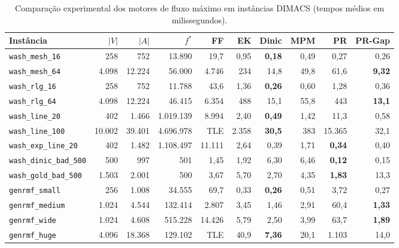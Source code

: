 \begin{table}[!ht]
\centering
\small
\setlength{\tabcolsep}{3.5pt}
\begin{tabular}{lrrrrrrrrr}
\toprule
\textbf{Instância} & $|V|$ & $|A|$ & $f^*$ & \textbf{FF} & \textbf{EK} & \textbf{Dinic} & \textbf{MPM} & \textbf{PR} & \textbf{PR-Gap} \\
\midrule
\texttt{wash\_mesh\_16} & 258 & 752 & 13.890 & 19,7 & 0,95 & \textbf{0,18} & 0,49 & 0,27 & 0,26 \\
\texttt{wash\_mesh\_64} & 4.098 & 12.224 & 56.000 & 4.746 & 234 & 14,8 & 49,8 & 61,6 & \textbf{9,32} \\
\texttt{wash\_rlg\_16} & 258 & 752 & 11.788 & 43,6 & 1,36 & \textbf{0,26} & 0,60 & 1,28 & 0,36 \\
\texttt{wash\_rlg\_64} & 4.098 & 12.224 & 46.415 & 6.354 & 488 & 15,1 & 55,8 & 443 & \textbf{13,1} \\
\texttt{wash\_line\_20} & 402 & 1.466 & 1.019.139 & 8.994 & 2,40 & \textbf{0,49} & 1,42 & 11,3 & 0,58 \\
\texttt{wash\_line\_100} & 10.002 & 39.401 & 4.696.978 & TLE & 2.358 & \textbf{30,5} & 383 & 15.365 & 32,1 \\
\texttt{wash\_exp\_line\_20} & 402 & 1.482 & 1.108.497 & 11.111 & 2,64 & 0,39 & 1,71 & \textbf{0,34} & 0,40 \\
\texttt{wash\_dinic\_bad\_500} & 500 & 997 & 501 & 1,45 & 1,92 & 6,30 & 6,46 & \textbf{0,12} & 0,15 \\
\texttt{wash\_gold\_bad\_500} & 1.503 & 2.001 & 500 & 3,67 & 5,70 & 2,70 & 4,35 & \textbf{1,83} & 13,3 \\
\texttt{genrmf\_small} & 256 & 1.008 & 34.555 & 69,7 & 0,33 & \textbf{0,26} & 0,51 & 3,72 & 0,27 \\
\texttt{genrmf\_medium} & 1.024 & 4.544 & 132.414 & 2.807 & 3,45 & 1,46 & 2,91 & 60,4 & \textbf{1,33} \\
\texttt{genrmf\_wide} & 1.024 & 4.608 & 515.228 & 14.426 & 5,79 & 2,50 & 3,99 & 63,7 & \textbf{1,89} \\
\texttt{genrmf\_huge} & 4.096 & 18.368 & 129.102 & TLE & 40,9 & \textbf{7,36} & 20,1 & 1.103 & 14,0 \\
\bottomrule
\end{tabular}
\caption{Comparação experimental dos motores de fluxo máximo em instâncias DIMACS (tempos médios em milissegundos).}
\label{tab:benchmarks_maxflow}
\end{table}
